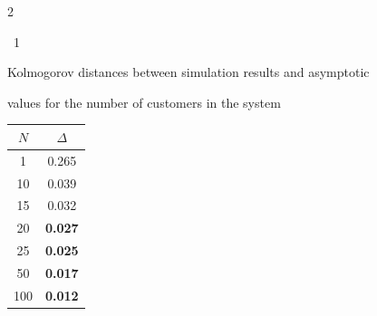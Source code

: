 \begin{multicols}{2}


\begin{center}


\begin{minipage}[t]{34mm}


{{\tablename~1}\ \ \small{Kolmogorov distances between simulation results and asymptotic 


values for the number of customers in the system}}





\vspace*{6pt}








{\small


\tabcolsep=14pt


\begin{tabular}{cc}


\hline


$N$ & $\Delta$\\


\hline


\hphantom{9}1 & 0.265\\


10 & 0.039\\


15 & 0.032\\


20 & \textbf{0.027}\\


25 & \textbf{0.025}\\


50 & \textbf{0.017}\\


100\hphantom{9} & \textbf{0.012}\\


\hline


\end{tabular}


}


\end{minipage}


\hfill









\end{center}
\end{multicols}
